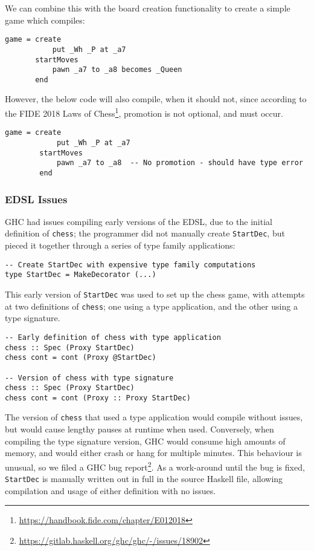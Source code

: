 \documentclass[12pt, a4paper]{scrartcl}
\begin{document}
We can combine this with the board creation functionality to create a simple game which compiles:

\begin{lstlisting}
game = create
           put _Wh _P at _a7
       startMoves
           pawn _a7 to _a8 becomes _Queen
       end
\end{lstlisting}

However, the below code will also compile, when it should not, since according to the FIDE 2018 Laws of Chess\footnote{\url{https://handbook.fide.com/chapter/E012018}}, promotion is not optional, and must occur.

\begin{lstlisting}
game = create
            put _Wh _P at _a7
        startMoves
            pawn _a7 to _a8  -- No promotion - should have type error
        end
\end{lstlisting}

\subsubsection{EDSL Issues}

GHC had issues compiling early versions of the EDSL, due to the initial definition of \lstinline{chess}; the programmer did not manually create \lstinline{StartDec}, but pieced it together through a series of type family applications:

\begin{lstlisting}
-- Create StartDec with expensive type family computations
type StartDec = MakeDecorator (...)
\end{lstlisting}

This early version of \lstinline{StartDec} was used to set up the chess game, with attempts at two definitions of \lstinline{chess}; one using a type application, and the other using a type signature.

\begin{lstlisting}
-- Early definition of chess with type application
chess :: Spec (Proxy StartDec)
chess cont = cont (Proxy @StartDec)

-- Version of chess with type signature
chess :: Spec (Proxy StartDec)
chess cont = cont (Proxy :: Proxy StartDec)
\end{lstlisting}

The version of \lstinline{chess} that used a type application would compile without issues, but would cause lengthy pauses at runtime when used. Conversely, when compiling the type signature version, GHC would consume high amounts of memory, and would either crash or hang for multiple minutes. This behaviour is unusual, so we filed a GHC bug report\footnote{\url{https://gitlab.haskell.org/ghc/ghc/-/issues/18902}}. As a work-around until the bug is fixed, \lstinline{StartDec} is manually written out in full in the source Haskell file, allowing compilation and usage of either definition with no issues.
\end{document}
